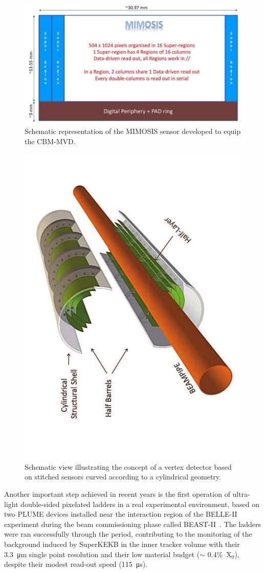  \begin{figure}
	\centering
	\includegraphics[width=.7\linewidth]{VertexDetector/CMOS/CHG-slide4.pdf}
	\caption{Schematic representation of the MIMOSIS sensor developed to equip the CBM-MVD.}
	\label{fig:VertexDetector:CMOS:MIMOSIS}
\end{figure}

\begin{figure}
	\centering
	\includegraphics[width=.5\linewidth]{VertexDetector/CMOS/ALICE-Vertex-Stitched.pdf}
    \caption{Schematic view illustrating the concept of a vertex detector based on stitched sensors curved according to a cylindrical geometry.}
	\label{fig:VertexDetector:CMOS:stitching}
\end{figure}

Another important step achieved in recent years is the first operation 
of ultra-light double-sided pixelated ladders in a real experimental 
environment, based on two PLUME devices installed near the interaction 
region of the BELLE-II experiment during the beam commissioning phase 
called BEAST-II~\cite{CUESTA2020163862}. The ladders were ran successfully 
through the period, contributing to the monitoring of the background 
induced by SuperKEKB in the inner tracker volume with their \SI{3.3}{\micro\meter}
single point resolution and their low material budget ($\sim$ \mbox{0.4\% X$_0$}),
despite their modest read-out speed (\SI{115}{\micro\second}).   


